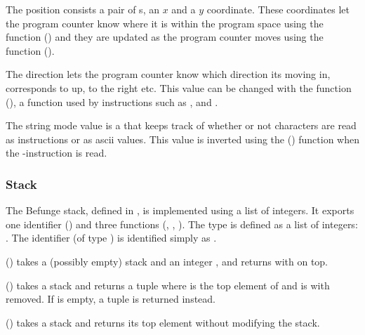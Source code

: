 \documentclass[12pt, a4paper]{article}
\begin{document}
The position consists a pair of s, an $x$ and a $y$ coordinate. These coordinates let the program counter know where it is within the program space using the function  () and they are updated as the program counter moves using the function  ().

The direction lets the program counter know which direction its moving in,  corresponds to up,  to the right etc. This value can be changed with the function  (), a function used by instructions such as \code{>},  and .

The string mode value is a  that keeps track of whether or not characters are read as instructions or as ascii values. This value is inverted using the  () function when the -instruction is read.

\subsubsection{Stack}
\label{sec:structstack}

The Befunge stack, defined in , is implemented using a list of integers. It exports one identifier () and three functions (, , ). The type  is defined as a list of integers: . The identifier  (of type ) is identified simply as .

\vspace{6pt}
\noindent
{} () takes a (possibly empty) stack  and an integer , and returns  with  on top.

\vspace{6pt}
\noindent
{} () takes a stack  and returns a tuple  where  is the top element of  and  is  with  removed. If  is empty, a tuple  is returned instead.

\vspace{6pt}
\noindent
{} () takes a stack and returns its top element without modifying the stack.
\end{document}
